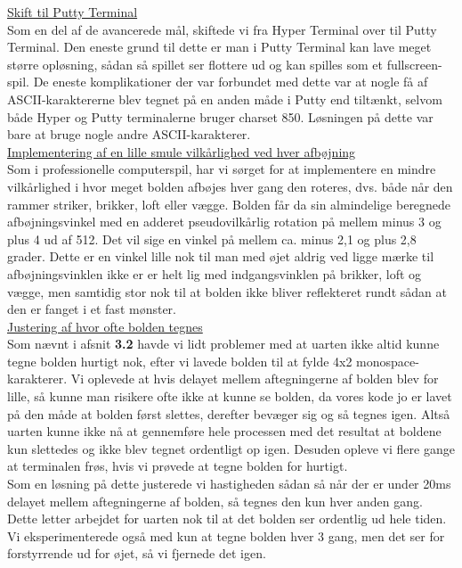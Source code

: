 \underline{Skift til Putty Terminal}\\

Som en del af de avancerede mål, skiftede vi fra Hyper Terminal over til Putty Terminal. Den eneste grund til dette er man i Putty Terminal kan lave meget større opløsning, sådan så spillet ser flottere ud og kan spilles som et fullscreen-spil. De eneste komplikationer der var forbundet med dette var at nogle få af ASCII-karaktererne blev tegnet på en anden måde i Putty end tiltænkt, selvom både Hyper og Putty terminalerne bruger charset 850. Løsningen på dette var bare at bruge nogle andre ASCII-karakterer.\\

\underline{Implementering af en lille smule vilkårlighed ved hver afbøjning}\\

Som i professionelle computerspil, har vi sørget for at implementere en mindre vilkårlighed i hvor meget bolden afbøjes hver gang den roteres, dvs. både når den rammer striker, brikker, loft eller vægge. Bolden får da sin almindelige beregnede afbøjningsvinkel med en adderet pseudovilkårlig rotation på mellem minus 3 og plus 4 ud af 512. Det vil sige en vinkel på mellem ca. minus 2,1 og plus 2,8 grader. Dette er en vinkel lille nok til man med øjet aldrig ved ligge mærke til afbøjningsvinklen ikke er er helt lig med indgangsvinklen på brikker, loft og vægge, men samtidig stor nok til at bolden ikke bliver reflekteret rundt sådan at den er fanget i et fast mønster.\\

\underline{Justering af hvor ofte bolden tegnes}\\

Som nævnt i afsnit \textbf{3.2} havde vi lidt problemer med at uarten ikke altid kunne tegne bolden hurtigt nok, efter vi lavede bolden til at fylde 4x2 monospace-karakterer. Vi oplevede at hvis delayet mellem aftegningerne af bolden blev for lille, så kunne man risikere ofte ikke at kunne se bolden, da vores kode jo er lavet på den måde at bolden først slettes, derefter bevæger sig og så tegnes igen. Altså uarten kunne ikke nå at gennemføre hele processen med det resultat at boldene kun slettedes og ikke blev tegnet ordentligt op igen. Desuden opleve vi flere gange at terminalen frøs, hvis vi prøvede at tegne bolden for hurtigt.\\
Som en løsning på dette justerede vi hastigheden sådan så når der er under 20ms delayet mellem aftegningerne af bolden, så tegnes den kun hver anden gang. Dette letter arbejdet for uarten nok til at det bolden ser ordentlig ud hele tiden. Vi eksperimenterede også med kun at tegne bolden hver 3 gang, men det ser for forstyrrende ud for øjet, så vi fjernede det igen.\\
